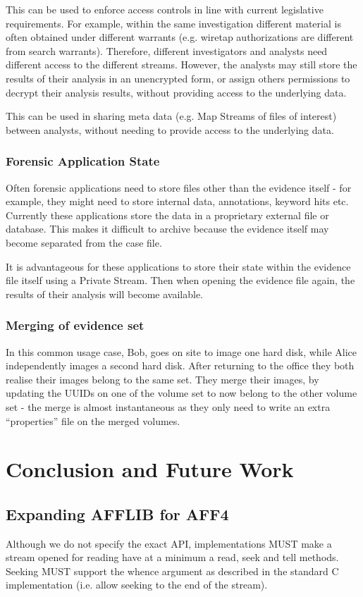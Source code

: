 \documentclass[10pt, conference]{IEEEtran}
\begin{document}
This can be used to enforce access controls in line with current
legislative requirements. For example, within the same investigation
different material is often obtained under different warrants
(e.g. wiretap authorizations are different from search
warrants). Therefore, different investigators and analysts need
different access to the different streams. However, the analysts may
still store the results of their analysis in an unencrypted form, or
assign others permissions to decrypt their analysis results, without
providing access to the underlying data. 

This can be used in sharing meta data (e.g. Map Streams of files of
interest) between analysts, without needing to provide access to the
underlying data.

\subsubsection{Forensic Application State}
Often forensic applications need to store files other than the
evidence itself - for example, they might need to store internal data,
annotations, keyword hits etc. Currently these applications store the
data in a proprietary external file or database. This makes it
difficult to archive because the evidence itself may become separated
from the case file.

It is advantageous for these applications to store their state within
the evidence file itself using a Private Stream. Then when opening the
evidence file again, the results of their analysis will become
available.

\subsubsection{Merging of evidence set}
In this common usage case, Bob, goes on site to image one hard disk,
while Alice independently images a second hard disk. After returning
to the office they both realise their images belong to the same
set. They merge their images, by updating the UUIDs on one of the
volume set to now belong to the other volume set - the merge is almost
instantaneous as they only need to write an extra ``properties'' file
on the merged volumes.

\section{Conclusion and Future Work}
\subsection{Expanding AFFLIB for AFF4}
Although we do not specify the exact API, implementations
MUST make a stream opened for reading have at a minimum a read, seek
and tell methods. Seeking MUST support the whence argument as
described in the standard C implementation (i.e. allow seeking to the
end of the stream).


\end{document}

